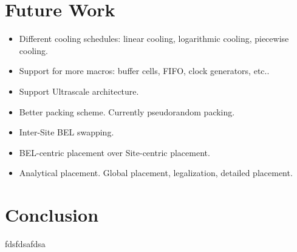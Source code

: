 \documentclass[twocolumn]{article}
\begin{document}
\section{Future Work}
    \begin{itemize}
    \item Different cooling schedules: linear cooling, logarithmic cooling, piecewise cooling.
    \item Support for more macros: buffer cells, FIFO, clock generators, etc..
    \item Support Ultrascale architecture. 
    \item Better packing scheme. Currently pseudorandom packing. 
    \item Inter-Site BEL swapping. 
    \item BEL-centric placement over Site-centric placement.
    \item Analytical placement. Global placement, legalization, detailed placement. 
    \end{itemize}

\section{Conclusion}
    fdsfdsafdsa
\end{document}
